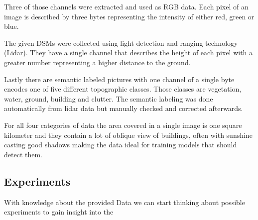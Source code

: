 Three of those channels were extracted and used as RGB data. 
Each pixel of an image is described by three bytes representing the intensity of either red, green or blue.

The given DSMs were collected using light detection and ranging technology (Lidar). 
They have a single channel that describes the height of each pixel with a greater number 
representing a higher distance to the ground. 

Lastly there are semantic labeled pictures with one channel of a single byte encodes one of five 
different topographic classes. Those classes are vegetation, water, ground, building and clutter. 
The semantic labeling was done automatically from lidar data but manually checked and corrected afterwards.

For all four categories of data the area covered in a single image
is one square kilometer and they contain a lot of oblique view of 
buildings, often with sunshine casting good shadows making the 
data ideal for training models that should detect them.

\subsection{Experiments}

With knowledge about the provided Data we can start thinking about possible experiments to
gain insight into the 